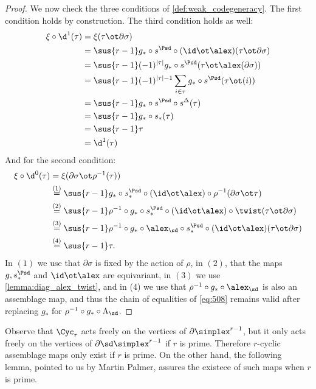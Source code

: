\begin{proof}
We now check the three conditions of \cref{def:weak_codegeneracy}. The first condition holds by construction. The third condition holds as well:
\begin{equation}\label{eq:508}
\begin{split}
	\xi\circ \d^1(\tau) &= \xi(\tau\ot \partial\sigma) \\
	&= \sus{r-1} g_*\circ s^{\Psd} \circ (\id \ot \alex) (\tau\ot \partial \sigma) \\
	&= \sus{r-1}(-1)^{|\tau|} g_*\circ s^{\Psd} (\tau\ot \alex(\partial \sigma)) \\
	&= \sus{r-1}(-1)^{|\tau|-1}\sum_{i\in \tau} g_*\circ s^{\Psd} (\tau\ot (i)) \\
	&= \sus{r-1} g_*\circ s^{\Psd} \circ s^{\Delta} (\tau) \\
	&= \sus{r-1} g_*\circ s_*(\tau) \\
	&= \sus{r-1} \tau \\
	&= \d^1(\tau)
\end{split}
\end{equation}
	And for the second condition:
	\begin{align*}
		\xi\circ \d^0(\tau) &= \xi(\partial\sigma \ot \rho^{-1}(\tau))
		\\
		&\overset{(1)}= \sus{r-1}g_*\circ s_*^{\Psd}\circ (\id\ot \alex)\circ \rho^{-1}(\partial\sigma \ot \tau)
		\\
		&\overset{(2)}{=} \sus{r-1}\rho^{-1}\circ g_*\circ s_*^{\Psd}\circ (\id\ot \alex)\circ \twist(  \tau \ot \partial\sigma)
		\\
		&\overset{(3)}{=} \sus{r-1}\rho^{-1}\circ g_*\circ \alex_{\sd}\circ s_*^{\Psd}\circ (\id\ot \alex)(\tau \ot \partial\sigma)
		\\
		&\overset{(4)}{=} \sus{r-1}\tau.
	\end{align*}
In $(1)$ we use that $\partial\sigma$ is fixed by the action of $\rho$, in $(2)$, that the maps $g,s_*^{\Psd}$ and $\id\ot \alex$ are equivariant, in $(3)$ we use \cref{lemma:diag_alex_twist}, and in (4) we use that $\rho^{-1}\circ g_*\circ \alex_{\sd}$ is also an assemblage map, and thus the chain of equalities of \eqref{eq:508} remains valid after replacing $g_*$ for $\rho^{-1}\circ g_*\circ \Lambda_{\sd}$.
\end{proof}


Observe that $\Cyc_r$ acts freely on the vertices of $\partial \simplex^{r-1}$, but it only acts freely on the vertices of $\partial \sd\simplex^{r-1}$ if $r$ is prime. Therefore $r$-cyclic assemblage maps only exist if $r$ is prime. On the other hand, the following lemma, pointed to us by Martin Palmer, assures the existece of such maps when $r$ is prime. %




